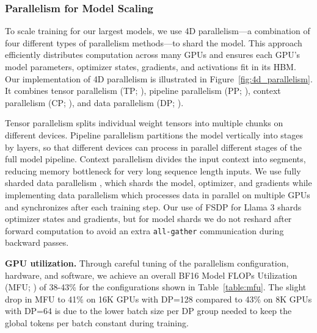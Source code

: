 \documentclass[dvipsnames]{fairmeta}
\begin{document}
\subsubsection{Parallelism for Model Scaling}
\label{section:4D-parallelism}

To scale training for our largest models, we use 4D parallelism—a combination of four different types of parallelism methods—to shard the model. This approach efficiently distributes computation across many GPUs and ensures each GPU's model parameters, optimizer states, gradients, and activations fit in its HBM. Our implementation of 4D parallelism is illustrated in Figure~\ref{fig:4d_parallelism}. It combines tensor parallelism (TP; \citet{NIPS2012_c399862d, shoeybi2019megatron, korthikanti2023reducing}), pipeline parallelism (PP; \citet{huang2019gpipe, narayanan2021efficient, lamy2023breadth}), context parallelism (CP; \citet{liu2023ring}), and data parallelism (DP; \citet{rajbhandari2020zeromemoryoptimizationstraining, ren2021zerooffloaddemocratizingbillionscalemodel, zhao2023pytorch}).

Tensor parallelism splits individual weight tensors into multiple chunks on different devices. Pipeline parallelism partitions the model vertically into stages by layers, so that different devices can process in parallel different stages of the full model pipeline. Context parallelism divides the input context into segments, reducing memory bottleneck for very long sequence length inputs. We use fully sharded data parallelism \citep[FSDP;][]{rajbhandari2020zeromemoryoptimizationstraining, ren2021zerooffloaddemocratizingbillionscalemodel, zhao2023pytorch}, which shards the model, optimizer, and gradients while implementing data parallelism which processes data in parallel on multiple GPUs and synchronizes after each training step. Our use of FSDP for Llama 3 shards optimizer states and gradients, but for model shards we do not reshard after forward computation to avoid an extra \texttt{all-gather} communication during backward passes.

\textbf{GPU utilization.}
Through careful tuning of the parallelism configuration, hardware, and software, we achieve an overall BF16 Model FLOPs Utilization (MFU; \citet{chowdhery2023palm}) of 38-43\% for the configurations shown in Table~\ref{table:mfu}.  The slight drop in MFU to 41\% on 16K GPUs with DP=128 compared to 43\% on 8K GPUs with DP=64 is due to the lower batch size per DP group needed to keep the global tokens per batch constant during training.
\end{document}
